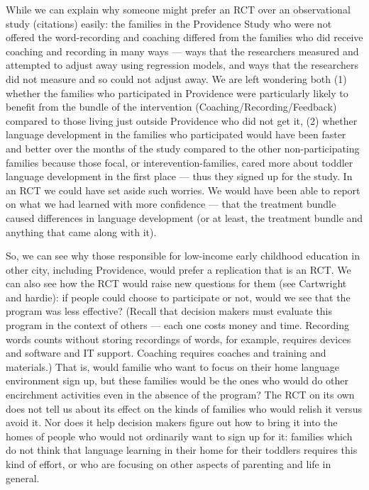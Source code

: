 \documentclass[
]{article}
\begin{document}
While we can explain why someone might prefer an RCT over an
observational study (citations) easily: the families in the Providence
Study who were not offered the word-recording and coaching differed from
the families who did receive coaching and recording in many ways ---
ways that the researchers measured and attempted to adjust away using
regression models, and ways that the researchers did not measure and so
could not adjust away. We are left wondering both (1) whether the
families who participated in Providence were particularly likely to
benefit from the bundle of the intervention
(Coaching/Recording/Feedback) compared to those living just outside
Providence who did not get it, (2) whether language development in the
families who participated would have been faster and better over the
months of the study compared to the other non-participating families
because those focal, or interevention-families, cared more about toddler
language development in the first place --- thus they signed up for the
study. In an RCT we could have set aside such worries. We would have
been able to report on what we had learned with more confidence --- that
the treatment bundle caused differences in language development (or at
least, the treatment bundle and anything that came along with it).

So, we can see why those responsible for low-income early childhood
education in other city, including Providence, would prefer a
replication that is an RCT. We can also see how the RCT would raise new
questions for them (see Cartwright and hardie): if people could choose
to participate or not, would we see that the program was less effective?
(Recall that decision makers must evaluate this program in the context
of others --- each one costs money and time. Recording words counts
without storing recordings of words, for example, requires devices and
software and IT support. Coaching requires coaches and training and
materials.) That is, would familie who want to focus on their home
language environment sign up, but these families would be the ones who
would do other encirchment activities even in the absence of the
program? The RCT on its own does not tell us about its effect on the
kinds of families who would relish it versus avoid it. Nor does it help
decision makers figure out how to bring it into the homes of people who
would not ordinarily want to sign up for it: families which do not think
that language learning in their home for their toddlers requires this
kind of effort, or who are focusing on other aspects of parenting and
life in general.
\end{document}
